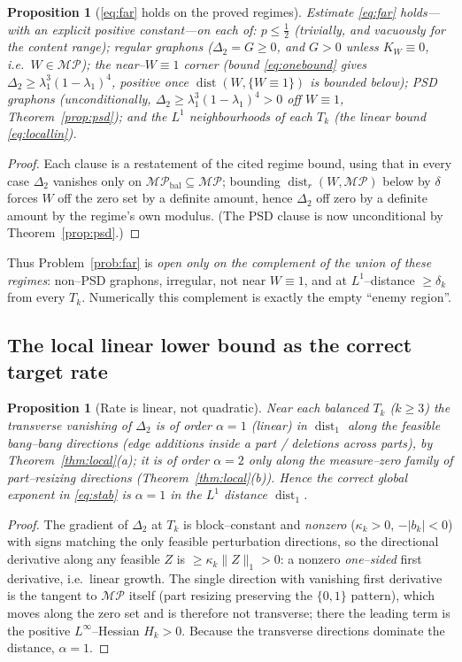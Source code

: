 \documentclass[11pt]{article}
\newtheorem{proposition}[theorem]{Proposition}
\theoremstyle{definition}
\newcommand{\dist}{\operatorname{dist}}
\newcommand{\MP}{\mathcal{MP}}
\newcommand{\kw}{K_W}
\newcommand{\Tk}{T_k}
\newcommand{\Lone}[1]{\lVert #1\rVert_1}
\begin{document}
\begin{proposition}[\eqref{eq:far} holds on the proved regimes]\label{prop:onregimes}
Estimate \eqref{eq:far} holds---with an explicit positive constant---on each of:
$p\le\tfrac12$ \textup{(}trivially, and vacuously for the content range\textup{)};
regular graphons \textup{(}$\Delta_2=G\ge0$, and $G>0$ unless $\kw\equiv0$, i.e.\
$W\in\MP$\textup{)}; the near--$W\equiv1$ corner \textup{(}bound \eqref{eq:onebound}
gives $\Delta_2\ge\lambda_1^3(1-\lambda_1)^4$, positive once $\dist(W,\{W\equiv1\})$
is bounded below\textup{)}; PSD graphons \textup{(}unconditionally,
$\Delta_2\ge\lambda_1^3(1-\lambda_1)^4>0$ off $W\equiv1$, Theorem~\ref{prop:psd}\textup{)};
and the $L^1$ neighbourhoods of each
$\Tk$ \textup{(}the linear bound \eqref{eq:locallin}\textup{)}.
\end{proposition}
\begin{proof}
Each clause is a restatement of the cited regime bound, using that in every case
$\Delta_2$ vanishes only on $\MP_{\mathrm{bal}}\subseteq\MP$; bounding
$\dist_r(W,\MP)$ below by $\delta$ forces $W$ off the zero set by a definite
amount, hence $\Delta_2$ off zero by a definite amount by the regime's own
modulus.  (The PSD clause is now unconditional by Theorem~\ref{prop:psd}.)
\end{proof}

Thus Problem~\ref{prob:far} is \emph{open only on the complement of the union of
these regimes}: non--PSD graphons, irregular, not near $W\equiv1$, and at
$L^1$--distance $\ge\delta_k$ from every $\Tk$.  Numerically this complement is
exactly the empty ``enemy region''.

\subsection{The local linear lower bound as the correct target rate}

\begin{proposition}[Rate is linear, not quadratic]\label{prop:rate}
Near each balanced $\Tk$ ($k\ge3$) the transverse vanishing of $\Delta_2$ is of
order $\alpha=1$ (linear) in $\dist_1$ along the feasible bang--bang directions
(edge additions inside a part / deletions across parts), by
Theorem~\ref{thm:local}(a); it is of order $\alpha=2$ only along the measure--zero
family of part--resizing directions (Theorem~\ref{thm:local}(b)).  Hence the
correct global exponent in \eqref{eq:stab} is $\alpha=1$ in the $L^1$ distance
$\dist_1$.
\end{proposition}
\begin{proof}
The gradient of $\Delta_2$ at $\Tk$ is block--constant and \emph{nonzero}
($\kappa_k>0$, $-|b_k|<0$) with signs matching the only feasible perturbation
directions, so the directional derivative along any feasible $Z$ is
$\ge\kappa_k\Lone Z>0$: a nonzero \emph{one--sided} first derivative, i.e.\ linear
growth.  The single direction with vanishing first derivative is the tangent to
$\MP$ itself (part resizing preserving the $\{0,1\}$ pattern), which moves along the
zero set and is therefore not transverse; there the leading term is the positive
$L^\infty$--Hessian $H_k>0$.  Because the transverse directions dominate the
distance, $\alpha=1$.
\end{proof}
\end{document}
